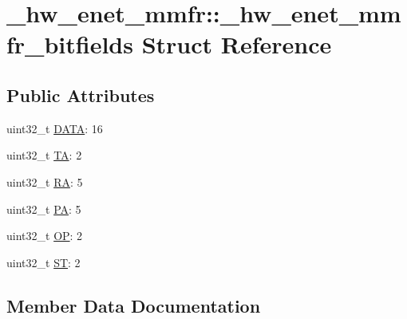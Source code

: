 \hypertarget{struct__hw__enet__mmfr_1_1__hw__enet__mmfr__bitfields}{}\section{\+\_\+hw\+\_\+enet\+\_\+mmfr\+:\+:\+\_\+hw\+\_\+enet\+\_\+mmfr\+\_\+bitfields Struct Reference}
\label{struct__hw__enet__mmfr_1_1__hw__enet__mmfr__bitfields}
\subsection*{Public Attributes}
\begin{DoxyCompactItemize}
\item 
uint32\+\_\+t \hyperlink{struct__hw__enet__mmfr_1_1__hw__enet__mmfr__bitfields_a88f9003ef4a0468a89f511d2408c7064}{D\+A\+TA}\+: 16
\item 
uint32\+\_\+t \hyperlink{struct__hw__enet__mmfr_1_1__hw__enet__mmfr__bitfields_a3b781a89abebc5c7488a5575de011fbb}{TA}\+: 2
\item 
uint32\+\_\+t \hyperlink{struct__hw__enet__mmfr_1_1__hw__enet__mmfr__bitfields_af6547b0e353f71bd2d26b4122329a3b6}{RA}\+: 5
\item 
uint32\+\_\+t \hyperlink{struct__hw__enet__mmfr_1_1__hw__enet__mmfr__bitfields_a79222866bf0b384cec888e65c21f741b}{PA}\+: 5
\item 
uint32\+\_\+t \hyperlink{struct__hw__enet__mmfr_1_1__hw__enet__mmfr__bitfields_a989d5f7f7d25cd868234c4cd6803a1f1}{OP}\+: 2
\item 
uint32\+\_\+t \hyperlink{struct__hw__enet__mmfr_1_1__hw__enet__mmfr__bitfields_a36c4a2c8e589d052da2de291c1040ab1}{ST}\+: 2
\end{DoxyCompactItemize}


\subsection{Member Data Documentation}
